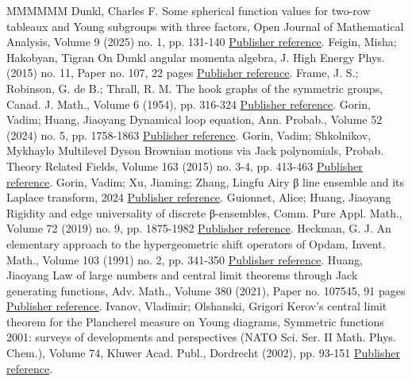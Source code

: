 \documentclass[11pt]{article}
\theoremstyle{definition}
\numberwithin{equation}{section}
\begin{document}
\begin{thebibliography}{MMMMMM}
 Dunkl, Charles F. Some spherical function values for two-row tableaux and Young subgroups with three factors, Open Journal of Mathematical Analysis, Volume 9 (2025) no. 1, pp. 131-140 \href{https://alco.centre-mersenne.org/articles/10.5802/alco.451/#Dun25b}{Publisher reference}.
 Feigin, Misha; Hakobyan, Tigran On Dunkl angular momenta algebra, J. High Energy Phys. (2015) no. 11, Paper no. 107, 22 pages \href{https://alco.centre-mersenne.org/articles/10.5802/alco.451/#feigin2015dunkl}{Publisher reference}.
 Frame, J. S.; Robinson, G. de B.; Thrall, R. M. The hook graphs of the symmetric groups, Canad. J. Math., Volume 6 (1954), pp. 316-324 \href{https://alco.centre-mersenne.org/articles/10.5802/alco.451/#frame1954hook}{Publisher reference}.
 Gorin, Vadim; Huang, Jiaoyang Dynamical loop equation, Ann. Probab., Volume 52 (2024) no. 5, pp. 1758-1863 \href{https://alco.centre-mersenne.org/articles/10.5802/alco.451/#gorin2024dynamical}{Publisher reference}.
 Gorin, Vadim; Shkolnikov, Mykhaylo Multilevel Dyson Brownian motions via Jack polynomials, Probab. Theory Related Fields, Volume 163 (2015) no. 3-4, pp. 413-463 \href{https://alco.centre-mersenne.org/articles/10.5802/alco.451/#gorin2015multilevel}{Publisher reference}.
 Gorin, Vadim; Xu, Jiaming; Zhang, Lingfu Airy β  line ensemble and its Laplace transform, 2024 \href{https://alco.centre-mersenne.org/articles/10.5802/alco.451/#GXZ2024}{Publisher reference}.
 Guionnet, Alice; Huang, Jiaoyang Rigidity and edge universality of discrete β-ensembles, Comm. Pure Appl. Math., Volume 72 (2019) no. 9, pp. 1875-1982 \href{https://alco.centre-mersenne.org/articles/10.5802/alco.451/#guionnet2019rigidity}{Publisher reference}.
 Heckman, G. J. An elementary approach to the hypergeometric shift operators of Opdam, Invent. Math., Volume 103 (1991) no. 2, pp. 341-350 \href{https://alco.centre-mersenne.org/articles/10.5802/alco.451/#heckman1991elementary}{Publisher reference}.
 Huang, Jiaoyang Law of large numbers and central limit theorems through Jack generating functions, Adv. Math., Volume 380 (2021), Paper no. 107545, 91 pages \href{https://alco.centre-mersenne.org/articles/10.5802/alco.451/#huang2021law}{Publisher reference}.
 Ivanov, Vladimir; Olshanski, Grigori Kerov’s central limit theorem for the Plancherel measure on Young diagrams, Symmetric functions 2001: surveys of developments and perspectives (NATO Sci. Ser. II Math. Phys. Chem.), Volume 74, Kluwer Acad. Publ., Dordrecht (2002), pp. 93-151 \href{https://alco.centre-mersenne.org/articles/10.5802/alco.451/#ivanov2002kerov}{Publisher reference}.

\end{thebibliography}
\end{document}
